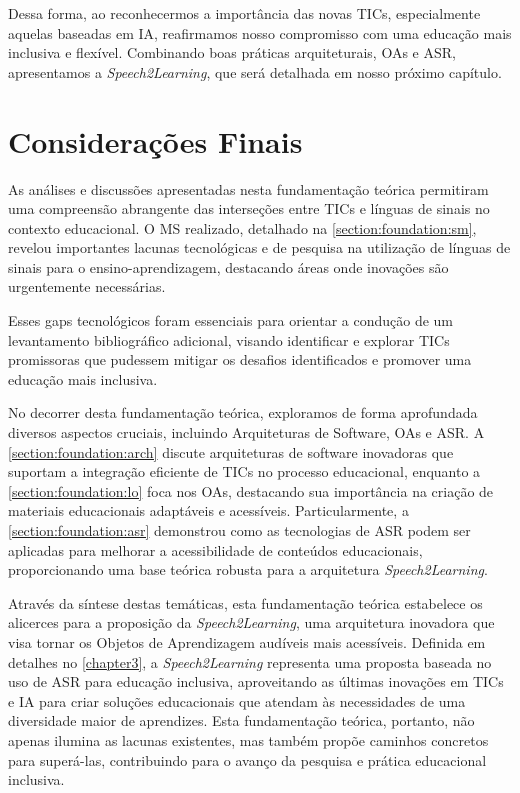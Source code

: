 Dessa forma, ao reconhecermos a importância das novas TICs, especialmente aquelas baseadas em IA, reafirmamos nosso compromisso com uma educação mais inclusiva e flexível. Combinando boas práticas arquiteturais, OAs e ASR, apresentamos a \textit{Speech2Learning}, que será detalhada em nosso próximo capítulo.

\section{Considerações Finais}

As análises e discussões apresentadas nesta fundamentação teórica permitiram uma compreensão abrangente das interseções entre TICs e línguas de sinais no contexto educacional. O MS realizado, detalhado na \autoref{section:foundation:sm}, revelou importantes lacunas tecnológicas e de pesquisa na utilização de línguas de sinais para o ensino-aprendizagem, destacando áreas onde inovações são urgentemente necessárias. 

Esses gaps tecnológicos foram essenciais para orientar a condução de um levantamento bibliográfico adicional, visando identificar e explorar TICs promissoras que pudessem mitigar os desafios identificados e promover uma educação mais inclusiva.

No decorrer desta fundamentação teórica, exploramos de forma aprofundada diversos aspectos cruciais, incluindo Arquiteturas de Software, OAs e ASR. A \autoref{section:foundation:arch} discute arquiteturas de software inovadoras que suportam a integração eficiente de TICs no processo educacional, enquanto a \autoref{section:foundation:lo} foca nos OAs, destacando sua importância na criação de materiais educacionais adaptáveis e acessíveis. Particularmente, a \autoref{section:foundation:asr} demonstrou como as tecnologias de ASR podem ser aplicadas para melhorar a acessibilidade de conteúdos educacionais, proporcionando uma base teórica robusta para a arquitetura \textit{Speech2Learning}.

Através da síntese destas temáticas, esta fundamentação teórica estabelece os alicerces para a proposição da \textit{Speech2Learning}, uma arquitetura inovadora que visa tornar os Objetos de Aprendizagem audíveis mais acessíveis. Definida em detalhes no \autoref{chapter3}, a \textit{Speech2Learning} representa uma proposta baseada no uso de ASR para educação inclusiva, aproveitando as últimas inovações em TICs e IA para criar soluções educacionais que atendam às necessidades de uma diversidade maior de aprendizes. Esta fundamentação teórica, portanto, não apenas ilumina as lacunas existentes, mas também propõe caminhos concretos para superá-las, contribuindo para o avanço da pesquisa e prática educacional inclusiva.